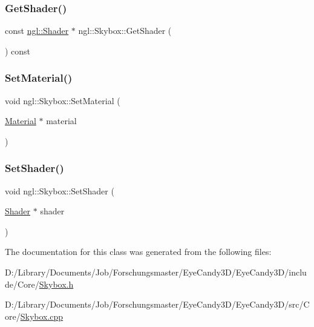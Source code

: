 \subsubsection{\texorpdfstring{Get\+Shader()}{GetShader()}\hspace{0.1cm}{\footnotesize\ttfamily [2/2]}}
{\footnotesize\ttfamily const \mbox{\hyperlink{classngl_1_1_shader}{ngl\+::\+Shader}} $\ast$ ngl\+::\+Skybox\+::\+Get\+Shader (\begin{DoxyParamCaption}{ }\end{DoxyParamCaption}) const}

\mbox{\label{classngl_1_1_skybox_af6f944ce477ea95da191972f645365c9}} 
\subsubsection{\texorpdfstring{Set\+Material()}{SetMaterial()}}
{\footnotesize\ttfamily void ngl\+::\+Skybox\+::\+Set\+Material (\begin{DoxyParamCaption}\item[{\mbox{\hyperlink{classngl_1_1_material}{Material}} $\ast$}]{material }\end{DoxyParamCaption})}

\mbox{\label{classngl_1_1_skybox_a2ef210bc0a50646ac014cd1d1dd1511a}} 
\subsubsection{\texorpdfstring{Set\+Shader()}{SetShader()}}
{\footnotesize\ttfamily void ngl\+::\+Skybox\+::\+Set\+Shader (\begin{DoxyParamCaption}\item[{\mbox{\hyperlink{classngl_1_1_shader}{Shader}} $\ast$}]{shader }\end{DoxyParamCaption})}



The documentation for this class was generated from the following files\+:\begin{DoxyCompactItemize}
\item 
D\+:/\+Library/\+Documents/\+Job/\+Forschungsmaster/\+Eye\+Candy3\+D/\+Eye\+Candy3\+D/include/\+Core/\mbox{\hyperlink{_skybox_8h}{Skybox.\+h}}\item 
D\+:/\+Library/\+Documents/\+Job/\+Forschungsmaster/\+Eye\+Candy3\+D/\+Eye\+Candy3\+D/src/\+Core/\mbox{\hyperlink{_skybox_8cpp}{Skybox.\+cpp}}\end{DoxyCompactItemize}
